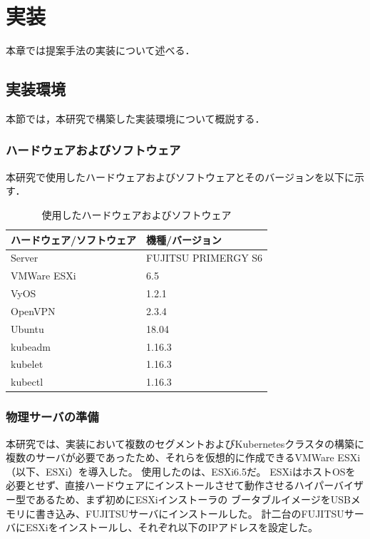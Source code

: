\chapter{実装}
\label{implementation}

本章では提案手法の実装について述べる．

\section{実装環境}
\label{implementation:environment}

本節では，本研究で構築した実装環境について概説する．

\subsection{ハードウェアおよびソフトウェア}
\label{implementation:environment:resouces}

本研究で使用したハードウェアおよびソフトウェアとそのバージョンを以下に示す．

\begin{table}[htb]
  \begin{center}
    \caption{使用したハードウェアおよびソフトウェア}
    \begin{tabular}{|l|l|} \hline
      ハードウェア/ソフトウェア & 機種/バージョン \\ \hline
      Server & FUJITSU PRIMERGY S6 \\ \hline
      VMWare ESXi & 6.5 \\ \hline
      VyOS & 1.2.1 \\ \hline
      OpenVPN & 2.3.4 \\ \hline
      Ubuntu & 18.04 \\ \hline
      kubeadm & 1.16.3 \\ \hline
      kubelet & 1.16.3 \\ \hline
      kubectl & 1.16.3 \\ \hline
    \end{tabular}
  \end{center}
\end{table}

\subsection{物理サーバの準備}
\label{implementation:esxi}

本研究では、実装において複数のセグメントおよびKubernetesクラスタの構築に複数のサーバが必要であったため、それらを仮想的に作成できるVMWare ESXi（以下、ESXi）を導入した。
使用したのは、ESXi6.5だ。
ESXiはホストOSを必要とせず、直接ハードウェアにインストールさせて動作させるハイパーバイザー型であるため、まず初めにESXiインストーラの
ブータブルイメージをUSBメモリに書き込み、FUJITSUサーバにインストールした。
計二台のFUJITSUサーバにESXiをインストールし、それぞれ以下のIPアドレスを設定した。

